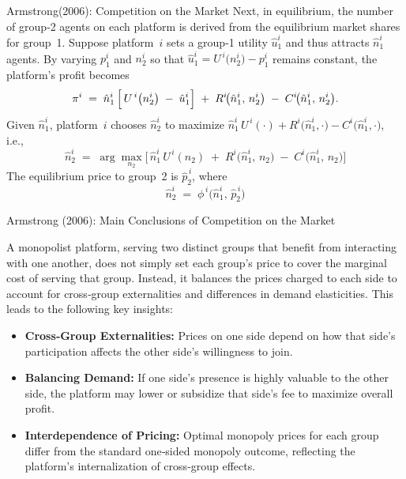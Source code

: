 \documentclass[aspectratio=169]{beamer}  %
\begin{document}
\begin{frame}{Armstrong(2006): Competition on the Market}
    Next, in equilibrium, the number of group‐2 agents on each platform is derived from 
    the equilibrium market shares for group~1.  Suppose platform~\(i\) sets a group‐1 
    utility \(\hat{u}_{1}^{i}\) and thus attracts \(\hat{n}_{1}^{i}\) agents.  
    By varying \(p_{1}^{i}\) and \(n_{2}^{i}\) so that \(\hat{u}_{1}^{i} 
    = U^{\,i}\bigl(n_{2}^{i}\bigr) - p_{1}^{i}\) remains constant, the platform’s profit 
    becomes
    \[
       \pi^{i}
       \;=\;
       \hat{n}_{1}^{i}\,\Bigl[\,
         U^{\,i}\bigl(n_{2}^{i}\bigr)
         \;-\;
         \hat{u}_{1}^{i}
       \Bigr]
       \;+\;
       R^{i}\!\bigl(\hat{n}_{1}^{i},\,n_{2}^{i}\bigr)
       \;-\;
       C^{i}\!\bigl(\hat{n}_{1}^{i},\,n_{2}^{i}\bigr).
    \]
    Given \(\hat{n}_{1}^{i}\), platform~\(i\) chooses \(\hat{n}_{2}^{i}\) to maximize 
    \(\hat{n}_{1}^{i}\,U^{\,i}(\cdot) + R^{i}\bigl(\hat{n}_{1}^{i},\cdot\bigr) 
    - C^{i}\bigl(\hat{n}_{1}^{i},\cdot\bigr)\), i.e.,
    \[
       \hat{n}_{2}^{i}
       \;=\;
       \arg\max_{n_{2}}
       \bigl[\,
          \hat{n}_{1}^{i}\,U^{\,i}(n_{2})
          \;+\;
          R^{i}\!\bigl(\hat{n}_{1}^{i},\,n_{2}\bigr)
          \;-\;
          C^{i}\!\bigl(\hat{n}_{1}^{i},\,n_{2}\bigr)
       \bigr]
    \]
    The equilibrium price to group~2 is \(\hat{p}_{2}^{\,i}\), where
    \[
       \hat{n}_{2}^{i}
       \;=\;
       \phi^{\,i}
       \bigl(\hat{n}_{1}^{i},\,\hat{p}_{2}^{\,i}\bigr)
    \]
    
\end{frame}

\begin{frame}{Armstrong (2006): Main Conclusions of Competition on the Market}
    \justifying  %
    
    A monopolist platform, serving two distinct groups that benefit from interacting 
    with one another, does not simply set each group’s price to cover the marginal 
    cost of serving that group. Instead, it balances the prices charged to each side 
    to account for cross‐group externalities and differences in demand elasticities.
    This leads to the following key insights:
    
    \begin{itemize}
        \item \textbf{Cross‐Group Externalities:} Prices on one side depend on how 
        that side’s participation affects the other side’s willingness to join.
    
        \item \textbf{Balancing Demand:} If one side’s presence is highly valuable 
        to the other side, the platform may lower or subsidize that side’s fee 
        to maximize overall profit.
    
        \item \textbf{Interdependence of Pricing:} Optimal monopoly prices for each 
        group differ from the standard one‐sided monopoly outcome, reflecting 
        the platform’s internalization of cross‐group effects.
    \end{itemize}
    
\end{frame}
\end{document}
